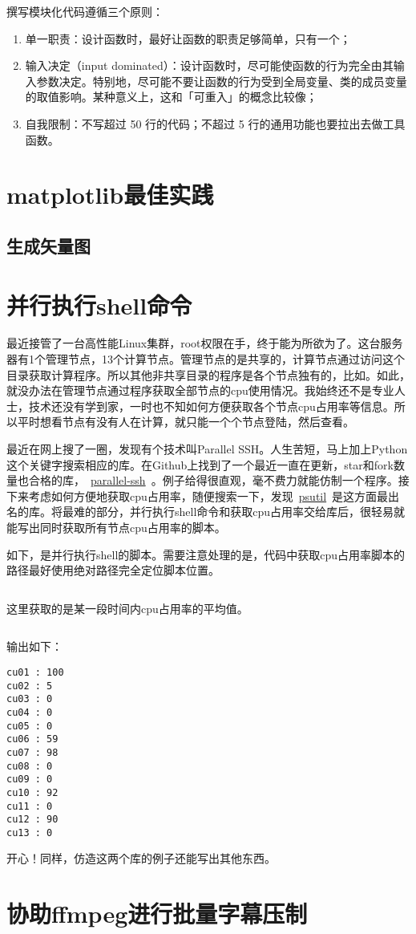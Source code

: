 撰写模块化代码遵循三个原则：

\begin{enumerate}
    \item 单一职责：设计函数时，最好让函数的职责足够简单，只有一个；
    \item 输入决定（input dominated）：设计函数时，尽可能使函数的行为完全由其输入参数决定。特别地，尽可能不要让函数的行为受到全局变量、类的成员变量的取值影响。某种意义上，这和「可重入」的概念比较像；
    \item 自我限制：不写超过 50 行的代码；不超过 5 行的通用功能也要拉出去做工具函数。
\end{enumerate}


\section{matplotlib最佳实践}
\subsection{生成矢量图}

\section{并行执行shell命令}

最近接管了一台高性能Linux集群，root权限在手，终于能为所欲为了。这台服务器有1个管理节点，13个计算节点。管理节点的是共享的，计算节点通过访问这个目录获取计算程序。所以其他非共享目录的程序是各个节点独有的，比如。如此，就没办法在管理节点通过程序获取全部节点的cpu使用情况。我始终还不是专业人士，技术还没有学到家，一时也不知如何方便获取各个节点cpu占用率等信息。所以平时想看节点有没有人在计算，就只能一个个节点登陆，然后查看。

最近在网上搜了一圈，发现有个技术叫Parallel SSH。人生苦短，马上加上Python这个关键字搜索相应的库。在Github上找到了一个最近一直在更新，star和fork数量也合格的库，~\href{https://github.com/ParallelSSH/parallel-ssh}{parallel-ssh}~。例子给得很直观，毫不费力就能仿制一个程序。接下来考虑如何方便地获取cpu占用率，随便搜索一下，发现~\href{https://github.com/giampaolo/psutil}{psutil}~是这方面最出名的库。将最难的部分，并行执行shell命令和获取cpu占用率交给库后，很轻易就能写出同时获取所有节点cpu占用率的脚本。

如下，是并行执行shell的脚本。需要注意处理的是，代码中获取cpu占用率脚本的路径最好使用绝对路径完全定位脚本位置。

\inputminted{python}{code/python/parallel_ex_shell.py}

这里获取的是某一段时间内cpu占用率的平均值。

\inputminted{python}{code/python/get_cpu_info.py}

输出如下：

\begin{verbatim}
cu01 : 100
cu02 : 5
cu03 : 0
cu04 : 0
cu05 : 0
cu06 : 59
cu07 : 98
cu08 : 0
cu09 : 0
cu10 : 92
cu11 : 0
cu12 : 90
cu13 : 0
\end{verbatim}

开心！同样，仿造这两个库的例子还能写出其他东西。

\section{协助ffmpeg进行批量字幕压制}


